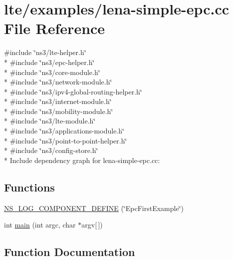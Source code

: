 \hypertarget{lena-simple-epc_8cc}{}\section{lte/examples/lena-\/simple-\/epc.cc File Reference}
\label{lena-simple-epc_8cc}
{\ttfamily \#include \char`\"{}ns3/lte-\/helper.\+h\char`\"{}}\\*
{\ttfamily \#include \char`\"{}ns3/epc-\/helper.\+h\char`\"{}}\\*
{\ttfamily \#include \char`\"{}ns3/core-\/module.\+h\char`\"{}}\\*
{\ttfamily \#include \char`\"{}ns3/network-\/module.\+h\char`\"{}}\\*
{\ttfamily \#include \char`\"{}ns3/ipv4-\/global-\/routing-\/helper.\+h\char`\"{}}\\*
{\ttfamily \#include \char`\"{}ns3/internet-\/module.\+h\char`\"{}}\\*
{\ttfamily \#include \char`\"{}ns3/mobility-\/module.\+h\char`\"{}}\\*
{\ttfamily \#include \char`\"{}ns3/lte-\/module.\+h\char`\"{}}\\*
{\ttfamily \#include \char`\"{}ns3/applications-\/module.\+h\char`\"{}}\\*
{\ttfamily \#include \char`\"{}ns3/point-\/to-\/point-\/helper.\+h\char`\"{}}\\*
{\ttfamily \#include \char`\"{}ns3/config-\/store.\+h\char`\"{}}\\*
Include dependency graph for lena-\/simple-\/epc.cc\+:
\subsection*{Functions}
\begin{DoxyCompactItemize}
\item 
\hyperlink{lena-simple-epc_8cc_ab5b2d5577332f9a2c1d6b2d32293401e}{N\+S\+\_\+\+L\+O\+G\+\_\+\+C\+O\+M\+P\+O\+N\+E\+N\+T\+\_\+\+D\+E\+F\+I\+NE} (\char`\"{}Epc\+First\+Example\char`\"{})
\item 
int \hyperlink{lena-simple-epc_8cc_a0ddf1224851353fc92bfbff6f499fa97}{main} (int argc, char $\ast$argv\mbox{[}$\,$\mbox{]})
\end{DoxyCompactItemize}


\subsection{Function Documentation}
